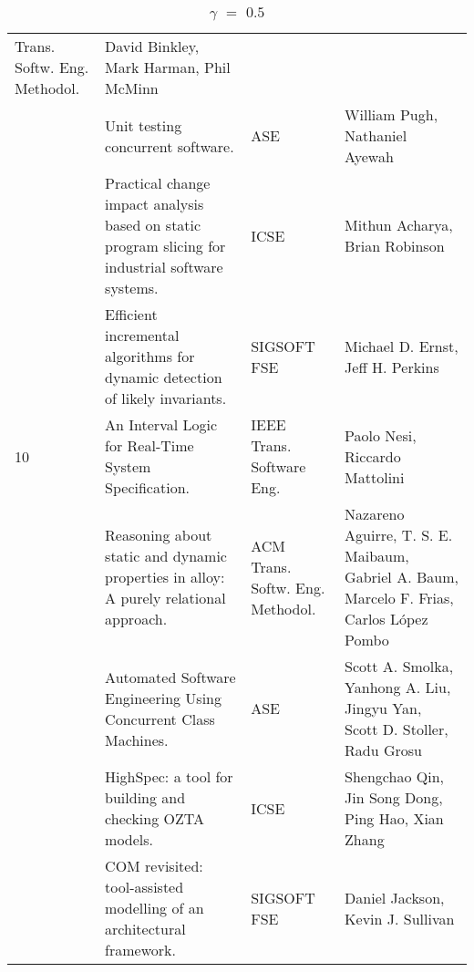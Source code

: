 \begin{table}[ht]
{\begin{tabular}{|llll|}
Trans. Softw. Eng. Methodol.& David Binkley, Mark Harman, Phil McMinn \\
\rowcolor{black!20} & Unit testing concurrent software.& ASE& William Pugh, Nathaniel Ayewah \\
 & Practical change impact analysis based on static program slicing for industrial software 
systems.& ICSE& Mithun Acharya, Brian Robinson \\
\rowcolor{black!20} & Efficient incremental algorithms for dynamic detection of likely invariants.& 
SIGSOFT FSE& Michael D. Ernst, Jeff H. Perkins \\
10 & An Interval Logic for Real-Time System Specification.& IEEE Trans. Software Eng.& Paolo Nesi, 
Riccardo Mattolini \\
\rowcolor{black!20} & Reasoning about static and dynamic properties in alloy: A purely relational 
approach.& ACM Trans. Softw. Eng. Methodol.& Nazareno Aguirre, T. S. E. Maibaum, Gabriel A. Baum, 
Marcelo F. Frias, Carlos López Pombo \\
 & Automated Software Engineering Using Concurrent Class Machines.& ASE& Scott A. Smolka, Yanhong A. 
Liu, Jingyu Yan, Scott D. Stoller, Radu Grosu \\
\rowcolor{black!20} & HighSpec: a tool for building and checking OZTA models.& ICSE& Shengchao Qin, 
Jin Song Dong, Ping Hao, Xian Zhang \\
 & COM revisited: tool-assisted modelling of an architectural framework.& SIGSOFT FSE& Daniel 
Jackson, Kevin J. Sullivan \\
    \hline
    \end{tabular}
  }
    \caption {$\gamma$ $=$ $0.5$}
\end{table}
